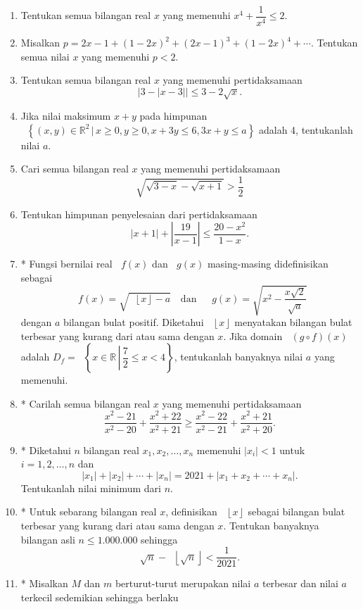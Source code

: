\documentclass[12pt]{article}
\newcommand*\floor[1]{\mathop{}\!\left\lfloor{#1}\right\rfloor}
\newcommand*\func[2]{\mathop{}\!{#1}{\left({#2}\right)}}
\newcommand*\set[2]{\mathop{}\!\left\lbrace{{#1} \, \left|\, {#2}\right.}\right\rbrace}
\begin{document}
\begin{enumerate}[leftmargin=*]
		\item Tentukan semua bilangan real $ x $ yang memenuhi $ x^{4} + \dfrac{1}{x^{4}} \leq 2 $.
		\item Misalkan $ p = 2x - 1 + \left(1 - 2x\right)^{2} + \left(2x - 1\right)^{3} + \left(1 - 2x\right)^{4} + \cdots $. Tentukan semua nilai $ x $ yang memenuhi $ p < 2 $.
		\item Tentukan semua bilangan real $ x $ yang memenuhi pertidaksamaan
		\[ \left|3 - \left|x - 3\right|\right| \leq 3 - 2\sqrt{x}. \]
		\item Jika nilai maksimum $ x + y $ pada himpunan $ \set{\left(x, y\right) \in \mathbb{R}^{2}}{x \geq 0, y \geq 0, x + 3y \leq 6, 3x + y \leq a} $ adalah 4, tentukanlah nilai $ a $.
		\item Cari semua bilangan real $ x $ yang memenuhi pertidaksamaan
		\[ \sqrt{\sqrt{3 - x} - \sqrt{x + 1}} > \frac{1}{2} \]
		\item Tentukan himpunan penyelesaian dari pertidaksamaan
		\[ \left|x + 1\right| + \left|\frac{19}{x - 1}\right| \leq \frac{20 - x^{2}}{1 - x}. \]
		\item* Fungsi bernilai real $ \func{f}{x} $ dan $ \func{g}{x} $ masing-masing didefinisikan sebagai
		\[ \func{f}{x} = \sqrt{\floor{x} - a} \quad \mbox{dan} \quad \func{g}{x} = \sqrt{x^{2} - \frac{x\sqrt{2}}{\sqrt{a}}} \]
		dengan $ a $ bilangan bulat positif. Diketahui $ \floor{x} $ menyatakan bilangan bulat terbesar yang kurang dari atau sama dengan $ x $. Jika domain $ \func{\left(g \circ f\right)}{x} $ adalah $ D_{f} = \set{x \in \mathbb{R}}{\dfrac{7}{2} \leq x < 4} $, tentukanlah banyaknya nilai $ a $ yang memenuhi.
		\item* Carilah semua bilangan real $ x $ yang memenuhi pertidaksamaan
		\[ \frac{x^{2} - 21}{x^{2} - 20} + \frac{x^{2} + 22}{x^{2} + 21} \geq \frac{x^{2} - 22}{x^{2} - 21} + \frac{x^{2} + 21}{x^{2} + 20}. \]
		\item* Diketahui $ n $ bilangan real $ x_{1}, x_{2}, \dots, x_{n} $ memenuhi $ \left|x_{i}\right| < 1 $ untuk $ i = 1, 2, \dots, n $ dan
		\[ \left|x_{1}\right| + \left|x_{2}\right| + \cdots + \left|x_{n}\right| = 2021 + \left|x_{1} + x_{2} + \cdots + x_{n}\right|. \]
		Tentukanlah nilai minimum dari $ n $.
		\item* Untuk sebarang bilangan real $ x $, definisikan $ \floor{x} $ sebagai bilangan bulat terbesar yang kurang dari atau sama dengan $ x $. Tentukan banyaknya bilangan asli $ n \leq 1.000.000 $ sehingga
		\[ \sqrt{n} - \floor{\sqrt{n}} < \frac{1}{2021}. \]
		\item* Misalkan $ M $ dan $ m $ berturut-turut merupakan nilai $ a $ terbesar dan nilai $ a $ terkecil sedemikian sehingga berlaku

\end{enumerate}
\end{document}
